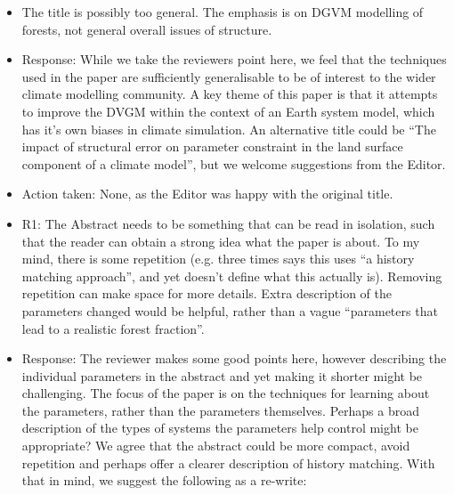 \documentclass[esd, manuscript]{copernicus}
\begin{document}
\begin{itemize}
\item{The title is possibly too general. The emphasis is on DGVM modelling of forests, not general overall issues of structure. }

\item{Response: While we take the reviewers point here, we feel that the techniques used in the paper are sufficiently generalisable to be of interest to the wider climate modelling community. A key theme of this paper is that it attempts to improve the DVGM within the context of an Earth system model, which has it's own biases in climate simulation. An alternative title could be ``The impact of structural error on parameter constraint in the land surface component of a climate model'', but we welcome suggestions from the Editor. }

\item{Action taken: None, as the Editor was happy with the original title.}

\item{R1: The Abstract needs to be something that can be read in isolation, such that the reader can obtain a strong idea what the paper is about. To my mind, there is some repetition (e.g. three times says this uses ``a history matching approach'', and yet doesn't define what this actually is). Removing repetition can make space for more details. Extra description of the parameters changed would be helpful, rather than a vague ``parameters that lead to a realistic forest fraction''. }

\item{Response: The reviewer makes some good points here, however describing the individual parameters in the abstract and yet making it shorter might be challenging. The focus of the paper is on the techniques for learning about the parameters, rather than the parameters themselves. Perhaps a broad description of the types of systems the parameters help control might be appropriate? We agree that the abstract could be more compact, avoid repetition and perhaps offer a clearer description of history matching. With that in mind, we suggest the following as a re-write:

}
\end{itemize}
\end{document}
